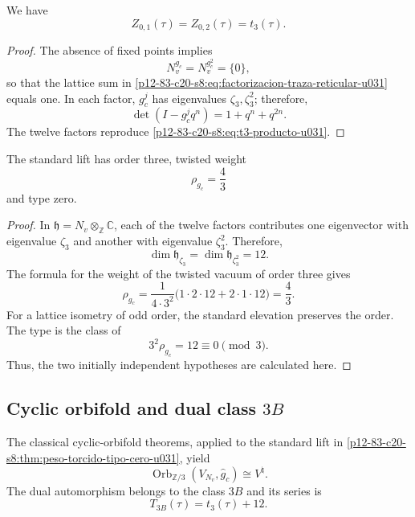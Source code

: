 \begin{proposition}
\label{p12-83-c20-s8:prop:traza-reticular-t3-u031}
We have
\[
 Z_{0,1}(\tau)=Z_{0,2}(\tau)=t_3(\tau).
\]
\end{proposition}

\begin{proof}
The absence of fixed points implies
\[
 N_v^{g_c}=N_v^{g_c^2}=\{0\},
\]
so that the lattice sum in
\eqref{p12-83-c20-s8:eq:factorizacion-traza-reticular-u031} equals one. In each factor,
\(g_c^j\) has eigenvalues \(\zeta_3,\zeta_3^2\); therefore,
\[
 \det(I-g_c^jq^n)=1+q^n+q^{2n}.
\]
The twelve factors reproduce \eqref{p12-83-c20-s8:eq:t3-producto-u031}.
\end{proof}

\begin{theorem}
\label{p12-83-c20-s8:thm:peso-torcido-tipo-cero-u031}
The standard lift has order three, twisted weight
\begin{equation}
 \rho_{g_c}=\frac43
 \label{p12-83-c20-s8:eq:peso-torcido-u031}
\end{equation}
and type zero.
\end{theorem}

\begin{proof}
In
\(\mathfrak h=N_v\otimes_{\mathbb Z}\mathbb C\), each of the twelve
factors contributes one eigenvector with eigenvalue \(\zeta_3\) and another with eigenvalue
\(\zeta_3^2\). Therefore,
\[
 \dim\mathfrak h_{\zeta_3}
 =\dim\mathfrak h_{\zeta_3^2}=12.
\]
The formula for the weight of the twisted vacuum of order three gives
\[
 \rho_{g_c}
 =\frac1{4\cdot3^2}
 \bigl(1\cdot2\cdot12+2\cdot1\cdot12\bigr)
 =\frac43.
\]
For a lattice isometry of odd order, the standard elevation preserves
the order. The type is the class of
\[
 3^2\rho_{g_c}=12\equiv0\pmod3.
\]
Thus, the two initially independent hypotheses are calculated here.
\end{proof}

\subsection{Cyclic orbifold and dual class \texorpdfstring{\(3B\)}{3B}}

\begin{theorem}
\label{p12-83-c20-s8:thm:orbifold-triadico-vnatural-u031}
The classical cyclic-orbifold theorems, applied to the standard lift
in \cref{p12-83-c20-s8:thm:peso-torcido-tipo-cero-u031}, yield
\begin{equation}
 \operatorname{Orb}_{\mathbb Z/3}
 (V_{N_v},\widehat g_c)
 \cong V^\natural.
 \label{p12-83-c20-s8:eq:orbifold-triadico-vnatural-u031}
\end{equation}
The dual automorphism belongs to the class \(3B\) and its series is
\begin{equation}
 T_{3B}(\tau)=t_3(\tau)+12.
 \label{p12-83-c20-s8:eq:serie-3b-u031}
\end{equation}
\end{theorem}

